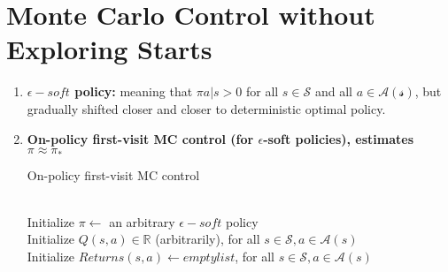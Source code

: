 \section{Monte Carlo Control without Exploring Starts}
\begin{enumerate}
	\item \textbf{$\epsilon-soft$ policy:} meaning that $\pi{a|s} > 0$ for all $s \in \mathcal{S}$ and all $a \in \mathcal{A(s)}$, but gradually shifted closer and closer to deterministic optimal policy.

	\item \textbf{On-policy first-visit MC control (for $\epsilon$-soft policies), estimates $\pi \approx \pi_*$}

	\begin{algorithm}[H]
	\label{alg:on_policy_first_visit_MC}
	\caption{On-policy first-visit MC control}
	\begin{algorithmic}[1]
	\Require \\Initialize $\pi \leftarrow$ an arbitrary $\epsilon-soft$ policy\\
	Initialize $Q(s,a) \in \mathbb{R}$ (arbitrarily), for all $s \in \mathcal{S}, a \in \mathcal{A}(s)$\\
	Initialize $Returns(s, a) \leftarrow empty list$, for all $s \in \mathcal{S}, a \in \mathcal{A}(s)$
	\Statex
	\Repeat {}
		

\end{algorithmic}
\end{algorithm}
\end{enumerate}
